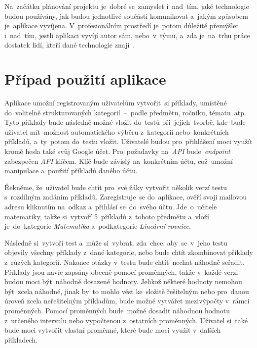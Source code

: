 \documentclass[11pt,a4paper]{report}
\let\oldacrshort\acrshort
\renewcommand{\acrshort}[1]{\emph{\normalsize\color[rgb]{0,0,0}\noindent\oldacrshort{#1}}}
\begin{document}
        Na~začátku plánování projektu je~dobré se~zamyslet i~nad~tím, jaké technologie budou používány, jak budou jednotlivé součásti komunikovat a~jakým způsobem je~aplikace vyvíjena. V~profesionálním prostředí je~potom důležité přemýšlet i~nad~tím, jestli aplikaci vyvíjí autor sám, nebo~v~týmu, a~zda je~na~trhu práce dostatek lidí, kteří dané technologie znají~\cite{bctynovsky:specifikacepozadavku}.

        \section{Případ použití aplikace}
            Aplikace umožní registrovaným uživatelům vytvořit~si příklady, umístěné do~volitelně strukturovaných kategorií~--~podle předmětu, ročníku, tématu~atp. Tyto příklady bude následně možné vložit do~testů při~jejich~tvorbě, kde~bude uživatel mít~možnost automatického výběru z~kategorií nebo~konkrétních příkladů, a~ty~potom do~testu vložit. Uživatelé budou pro~přihlášení moci využít kromě hesla také svůj Google účet. Pro~požadavky na~\acrshort{API} bude~\emph{endpoint} zabezpečen \acrshort{API} klíčem. Klíč bude závislý na~konkrétním účtu, což~umožní manipulace a~použití příkladů daného účtu.
            
            Řekněme, že~uživatel bude chtít pro~své žáky vytvořit několik verzí testu s~rozdílným zadáním příkladů. Zaregistruje~se do~aplikace, ověří svoji mailovou adresu kliknutím na~odkaz a~přihlásí se~do~svého účtu. Jde~o~učitele matematiky, takže si~vytvoří 5~příkladů z~tohoto předmětu a~vloží je~do~kategorie \emph{Matematika} a~podkategorie \emph{Lineární rovnice}.

            Následně si~vytvoří test a~může si~vybrat, zda~chce, aby~se~v~jeho testu objevily všechny příklady z~dané kategorie, nebo bude chtít zkombinovat příklady z~růzých kategorií. Nakonec otázky v~testu bude chtít~nechat náhodně seřadit. Příklady jsou navíc zapsány obecně pomocí proměnných, takže v~každé verzi budou moci být~náhodně dosazené hodnoty. Jelikož některé hodnoty nemohou být~zcela náhodné, jinak by~to mohlo vést ke~složitě řešitelným nebo pro~danou úroveň zcela neřešitelným příkladům, bude možné vytvářet mezivýpočty v~rámci proměnných. Pomocí proměnných bude~možné dosadit náhodnou hodnotu z~určeného intervalu nebo vypočtenou z~ostatních proměnných. Uživatel si~také bude moci vytvořit vlastní proměnné, které bude moci využít v~dalších příkladech. 
\end{document}
